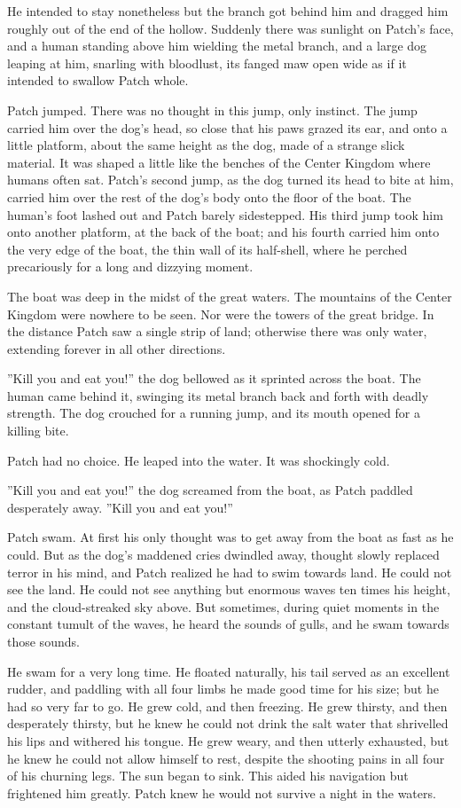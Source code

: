 \documentclass[12pt]{book}
\begin{document}
He intended to stay nonetheless %
but the branch got behind him and dragged him roughly out of the end of the hollow. Suddenly there was sunlight on Patch's face, and a human standing above him wielding the metal branch, and a large dog leaping at him, snarling with bloodlust, its fanged maw open wide as if it intended to swallow Patch whole.

Patch jumped. There was no thought in this jump, only instinct. The jump carried him over the dog's head, so close that his paws grazed its ear, and onto a little platform, about the same height as the dog, made of a strange slick material. It was shaped a little like the benches of the Center Kingdom where humans often sat. Patch's second jump, as the dog turned its head to bite at him, carried him over the rest of the dog's body onto the floor of the boat. The human's foot lashed out and Patch barely sidestepped. His third jump took him onto another platform, at the back of the boat; and his fourth carried him onto the very edge of the boat, the thin wall of its half-shell, where he perched precariously for a long and dizzying moment.

The boat was deep in the midst of the great waters. The mountains of the Center Kingdom were nowhere to be seen. Nor were the towers of the great bridge. In the distance Patch saw a single strip of land; otherwise there was only water, extending forever in all other directions.

''Kill you and eat you!'' the dog bellowed as it sprinted across the boat. The human came behind it, swinging its metal branch back and forth with deadly strength. The dog crouched for a running jump, and its mouth opened for a killing bite.

Patch had no choice. He leaped into the water. It was shockingly cold.

''Kill you and eat you!'' the dog screamed from the boat, as Patch paddled desperately away. ''Kill you and eat you!''

Patch swam. At first his only thought was to get away from the boat as fast as he could. But as the dog's maddened cries dwindled away, thought slowly replaced terror in his mind, and Patch realized he had to swim towards land. He could not see the land. He could not see anything but enormous waves ten times his height, and the cloud-streaked sky above. But sometimes, during quiet moments in the constant tumult of the waves, he heard the sounds of gulls, and he swam towards those sounds.

He swam for a very long time. He floated naturally, his tail served as an excellent rudder, and paddling with all four limbs he made good time for his size; but he had so very far to go. He grew cold, and then freezing. He grew thirsty, and then desperately thirsty, but he knew he could not drink the salt water that shrivelled his lips and withered his tongue. He grew weary, and then utterly exhausted, but he knew he could not allow himself to rest, despite the shooting pains in all four of his churning legs. The sun began to sink. This aided his navigation but frightened him greatly. Patch knew he would not survive a night in the waters.
\end{document}
